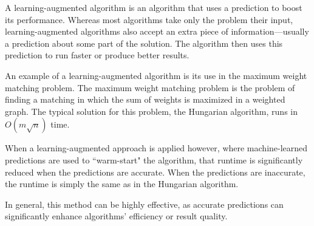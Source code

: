 \documentclass[12pt]{article}
\begin{document}
A learning-augmented algorithm \cite{roughgarden_algorithms_2020} is an algorithm that uses a prediction to boost its performance.
Whereas most algorithms take only the problem their input, learning-augmented algorithms also accept an extra piece of information—usually a prediction about some part of the solution.
The algorithm then uses this prediction to run faster or produce better results.

An example of a learning-augmented algorithm is its use in the maximum weight matching problem.
The maximum weight matching problem \cite{duan_linear-time_2014} is the problem of finding a matching in which the sum of weights is maximized in a weighted graph.
The typical solution for this problem, the Hungarian algorithm, runs in $O(m\sqrt{n})$ time.

When a learning-augmented approach \cite{dinitz_faster_2021} is applied however, where machine-learned predictions are used to ``warm-start" the algorithm, that runtime is significantly reduced when the predictions are accurate.
When the predictions are inaccurate, the runtime is simply the same as in the Hungarian algorithm.

In general, this method can be highly effective, as accurate predictions can significantly enhance algorithms' efficiency or result quality.

\newpage


\end{document}
